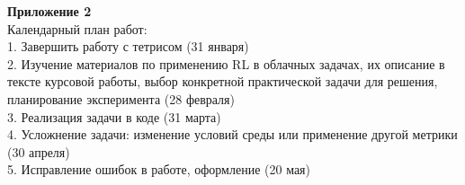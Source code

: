 \documentclass{article}
\newcommand\zz[1]{\par{\normalsize\strut #1} \hfill\ignorespaces}
\begin{document}
\zz{}\textbf{Приложение 2\\}
Календарный план работ:\\
1. Завершить работу с тетрисом (31 января)\\
2. Изучение материалов по применению RL в облачных задачах, их описание в тексте курсовой работы, выбор конкретной практической задачи для решения, планирование эксперимента (28 февраля)\\
3. Реализация задачи в коде (31 марта)\\
4. Усложнение задачи: изменение условий среды или применение другой метрики (30 апреля)\\
5. Исправление ошибок в работе, оформление (20 мая)\\
\end{document}
